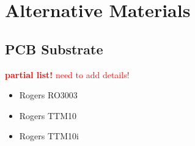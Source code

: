 \section{Alternative Materials}
\subsection{PCB Substrate
\label{subsec:PCBsubstrateAlt}}
\textcolor{red}{\textbf{partial list!} need to add details!}
\begin{itemize}
    \item Rogers RO3003	
    \item Rogers TTM10
    \item Rogers TTM10i
\end{itemize}
